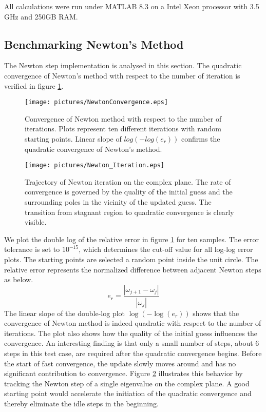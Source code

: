 \documentclass[final,leqno,onefignum,onetabnum]{siamltex1213}
\begin{document}
All calculations were run under MATLAB 8.3 on a Intel Xeon processor with 3.5 GHz and 250GB RAM. 
\subsection{Benchmarking Newton's Method}
The Newton step implementation is analysed in this section. The quadratic convergence of Newton's method with respect to the number of iteration is verified in figure \ref{fig:NewtonBenchmark}.
\begin{figure}\label{fig:NewtonBenchmark}
\begin{center}
\texttt{[image: pictures/NewtonConvergence.eps]}
\end{center}
\caption{Convergence of Newton method with respect to the number of iterations. \textnormal{Plots represent ten different iterations with random starting points. Linear slope of $log(-log(e_r))$ confirms the quadratic convergence of Newton's method.}}
\end{figure}

\begin{figure}\label{fig:NewtonIterate}
\begin{center}
\texttt{[image: pictures/Newton\_Iteration.eps]}
\end{center}
\caption{Trajectory of Newton iteration on the complex plane. \textnormal{The rate of convergence is governed by the quality of the initial guess and the surrounding poles in the vicinity of the updated guess. The transition from stagnant region to quadratic convergence is clearly visible.}} 
\end{figure}
We plot the double log of the relative error in figure \ref{fig:NewtonBenchmark} for ten samples. The error tolerance is set to $10^{-15}$, which determines the cut-off value for all log-log error plots. The starting points are selected a random point inside the unit circle. The relative error represents the normalized difference between adjacent Newton steps as below.
\begin{equation}\label{eq:er}
e_r=\frac{|\omega_{j+1} - \omega_j|}{|\omega_j|}
\end{equation}
The linear slope of the double-log plot $\log(-\log(e_r))$ shows that the convergence of Newton method is indeed quadratic with respect to the number of iterations. The plot also shows how the quality of the initial guess influences the convergence. An interesting finding is that only a small number of steps, about 6 steps in this test case, are required after the quadratic convergence begins. Before the start of fast convergence, the update slowly moves around and has no significant contribution to convergence. Figure \ref{fig:NewtonIterate} illustrates this behavior by tracking the Newton step of a single eigenvalue on the complex plane. A good starting point would accelerate the initiation of the quadratic convergence and thereby eliminate the idle steps in the beginning. 
\end{document}
